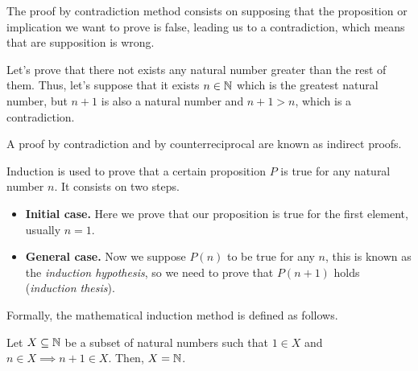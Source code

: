 \begin{defn}
    The proof by contradiction method consists on supposing that the proposition or implication we want to prove is false,
    leading us to a contradiction, which means that are supposition is wrong.
\end{defn}

\begin{example}
    Let's prove that there not exists any natural number greater than the rest of them. Thus, let's suppose that it exists
    $n\in\N$ which is the greatest natural number, but $n + 1$ is also a natural number and $n + 1 > n$, which is a 
    contradiction.
\end{example}

\begin{note}
    A proof by contradiction and by counterreciprocal are known as indirect proofs.
\end{note}

\begin{defn}
    Induction is used to prove that a certain proposition $P$ is true for any natural number $n$. It consists on two steps.
    \begin{itemize}[itemsep = -2pt, topsep = -1pt]
        \item\textbf{Initial case.} Here we prove that our proposition is true for the first element, usually $n = 1$.
        \item\textbf{General case.} Now we suppose $P(n)$ to be true for any $n$, this is known as the 
            \textit{induction hypothesis}, so we need to prove that $P(n + 1)$ holds (\textit{induction thesis}).
    \end{itemize}
\end{defn}

\noindent Formally, the mathematical induction method is defined as follows.

\begin{prop}\label{prop:math-induction}
    Let $X\subseteq\N$ be a subset of natural numbers such that $1\in X$ and $n\in X\implies n+1\in X$. Then, $X = \N$. 
\end{prop}

